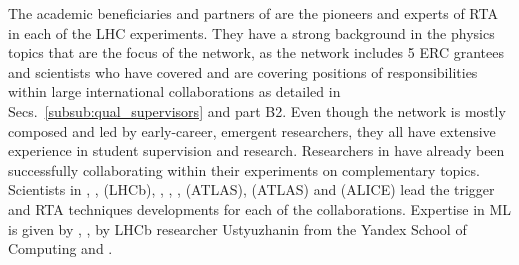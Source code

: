 The academic beneficiaries and partners of \acronym are 
the pioneers and experts of RTA in each of the LHC experiments. They have a strong
background in the physics topics that are the focus of the network, as the network includes 5 ERC grantees
and scientists who have covered and are covering positions of responsibilities within large
international collaborations as detailed in Secs.~\ref{subsub:qual_supervisors} and part B2.
Even though the network is mostly composed and led by early-career, emergent researchers, 
they all have extensive experience in student supervision and research. 
Researchers in \acronym have already been successfully collaborating within their experiments on complementary topics. 
Scientists in \nikhefentity, \cnrsentity, \dortmundentity (LHCb), \oregonentity, \ohioentity, \lundentity, \heidelbergentity (ATLAS),
\helsinkientity (ATLAS)  and \lundentity (ALICE) lead the trigger and RTA techniques
developments for each of the collaborations. Expertise in ML is given by \pointeightentity, \unigeentity, 
by LHCb researcher Ustyuzhanin from the Yandex School of Computing and \yandexentity.  

% 


